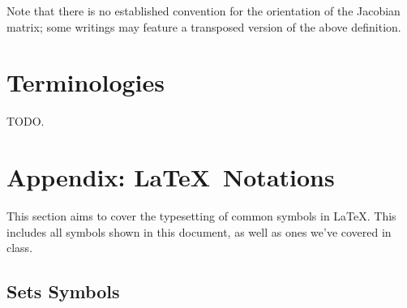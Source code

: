 \documentclass[12pt]{article}
\theoremstyle{definition}
\begin{document}
 	Note that there is no established convention for the orientation of the Jacobian matrix; some writings may feature a transposed version of the above definition.
 	
 	\section{Terminologies}
 	\label{sec:terms}
 	
 	TODO.
 	
 	\section{Appendix: \LaTeX\ Notations}
 	
 	This section aims to cover the typesetting of common symbols in \LaTeX.	 This includes all symbols shown in this document, as well as ones we've covered in class.
 	
 	\subsection{Sets Symbols}
 	
\end{document}
